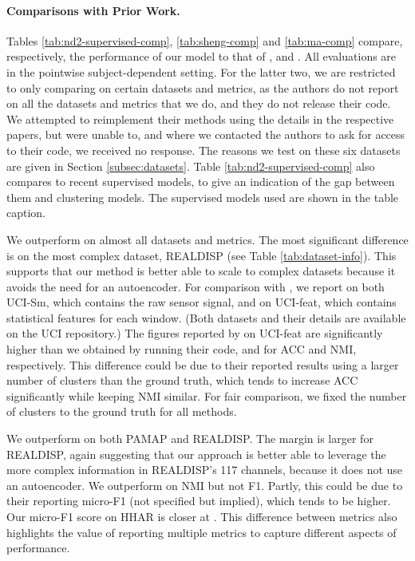 \documentclass[wcp]{jmlr}
\begin{document}
\paragraph{Comparisons with Prior Work.}
Tables \ref{tab:nd2-supervised-comp}, \ref{tab:sheng-comp} and \ref{tab:ma-comp} compare, respectively, the performance of our model to that of \cite{mcconville2021n2d}, \cite{sheng2020unsupervised} and \cite{ma2021unsupervised}. All evaluations are  in the pointwise subject-dependent setting. For the latter two, we are restricted to only comparing on certain datasets and metrics, as the authors do not report on all the datasets and metrics that we do, and they do not release their code. We attempted to reimplement their methods using the details  in the respective papers, but were unable to, and where we contacted the authors to ask for access to their code, we received no response. The reasons we test on these six datasets are given in Section \ref{subsec:datasets}. Table \ref{tab:nd2-supervised-comp} also compares to recent supervised models, to give an indication of the gap between them and clustering models. The supervised models used are shown in the table caption. 

We outperform \citep{mcconville2021n2d} on almost all datasets and metrics. The most significant difference is on the most complex dataset, REALDISP (see Table \ref{tab:dataset-info}). This supports that our method is better able to scale to complex datasets because it avoids the need for an autoencoder. For comparison with \citep{mcconville2021n2d}, we report on both UCI-Sm, which contains the raw sensor signal, and on UCI-feat, which contains statistical features for each window. (Both datasets and their details are available on the UCI repository.) The figures reported by \cite{mcconville2021n2d} on UCI-feat are significantly higher than we obtained by running their code,  and  for ACC and NMI, respectively. This difference could be due to their reported results using a larger number of clusters than the ground truth, which tends to increase ACC significantly while keeping NMI similar. For fair comparison, we fixed the number of clusters to the ground truth for all methods.

We outperform \citep{sheng2020unsupervised} on both PAMAP and REALDISP. The margin is larger for REALDISP, again suggesting that our approach is better able to leverage the more complex information in REALDISP's 117 channels, because it does not use an autoencoder. We outperform \citep{ma2021unsupervised} on NMI but not F1. Partly, this could be due to their reporting micro-F1 (not specified but implied), which tends to be higher. Our micro-F1 score on HHAR is closer at . This difference between metrics also highlights the value of reporting multiple metrics to capture different aspects of performance.
\end{document}
